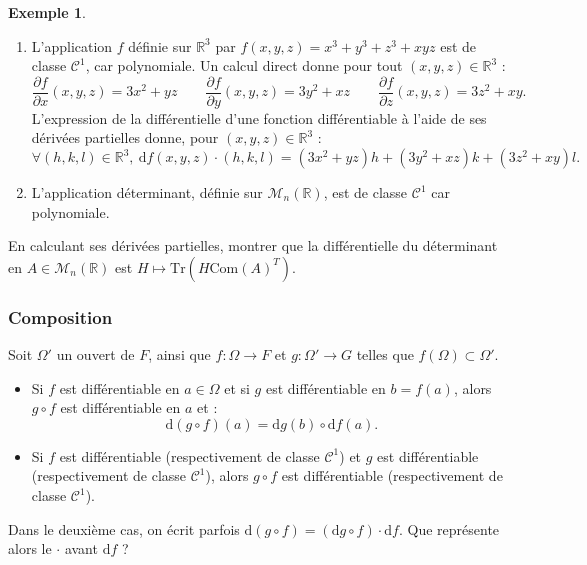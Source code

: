 \documentclass[french]{article}
\newcommand{\R}{\mathbb{R}}
\newcommand{\Tr}{\text{Tr}}
\renewcommand{\d}{\text{d}}
\theoremstyle{plain}
\theoremstyle{definition}
\newtheorem*{ex}{Exemple}
\theoremstyle{remark}
\begin{document}
\begin{ex}
	\begin{enumerate}
		\item L'application $f$ définie sur $\R^3$ par $f(x,y,z)=x^3+y^3+z^3+xyz$ est de classe $\mathcal{C}^1$, car polynomiale. Un calcul direct donne pour tout $(x,y,z)\in\R^3$ :
		$$\frac{\partial f}{\partial x}(x,y,z)=3x^2+yz\quad\quad\frac{\partial f}{\partial y}(x,y,z)=3y^2+xz\quad\quad\frac{\partial f}{\partial z}(x,y,z)=3z^2+xy.$$
		L'expression de la différentielle d'une fonction différentiable à l'aide de ses dérivées partielles donne, pour $(x,y,z)\in\R^3$ :
		$$\forall(h,k,l)\in\R^3,\ \d f(x,y,z)\cdot(h,k,l)=(3x^2+yz)h+(3y^2+xz)k+(3z^2+xy)l.$$
		\item L'application déterminant, définie sur $\mathcal{M}_n(\R)$, est de classe $\mathcal{C}^1$ car polynomiale.
	\end{enumerate}
\end{ex}

\begin{exo}
	En calculant ses dérivées partielles, montrer que la différentielle du déterminant en $A\in\mathcal{M}_n(\R)$ est $H\mapsto\Tr(H\text{Com}(A)^T)$.
\end{exo}

\subsubsection*{Composition}

\begin{prop}%
	Soit $\Omega'$ un ouvert de $F$, ainsi que $f:\Omega\to F$ et $g:\Omega'\to G$ telles que $f(\Omega)\subset\Omega'$.
	\begin{itemize}
		\item Si $f$ est différentiable en $a\in\Omega$ et si $g$ est différentiable en $b=f(a)$, alors $g\circ f$ est différentiable en $a$ et :
		$$\d (g\circ f)(a)=\d g(b)\circ\d f(a).$$
		\item Si $f$ est différentiable (respectivement de classe $\mathcal{C}^1$) et $g$ est différentiable (respectivement de classe $\mathcal{C}^1$), alors $g\circ f$ est différentiable (respectivement de classe $\mathcal{C}^1$).
	\end{itemize}
\end{prop}

\begin{exo}
	Dans le deuxième cas, on écrit parfois $\d (g\circ f)=(\d g\circ f)\cdot\d f$. Que représente alors le $\cdot$ avant $\d f$ ?
\end{exo}
\end{document}
